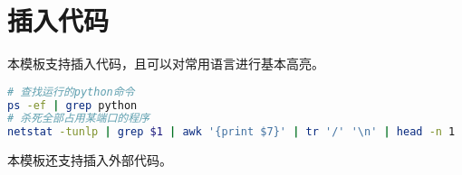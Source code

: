 \section{插入代码}
\par 本模板支持插入代码，且可以对常用语言进行基本高亮。
\begin{lstlisting}[language=bash,label=code:bash]
# 查找运行的python命令
ps -ef | grep python
# 杀死全部占用某端口的程序
netstat -tunlp | grep $1 | awk '{print $7}' | tr '/' '\n' | head -n 1 | xargs kill -9
\end{lstlisting}
\par 本模板还支持插入外部代码。

